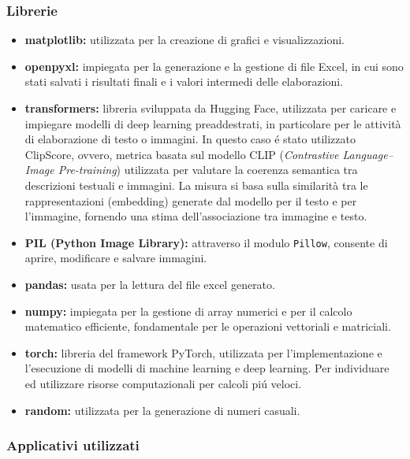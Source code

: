 \documentclass{article}
\begin{document}
\subsubsection{Librerie}
\begin{itemize}
\item \textbf{matplotlib:} utilizzata per la creazione di grafici e visualizzazioni.

\item \textbf{openpyxl:} impiegata per la generazione e la gestione di file Excel, in cui sono stati salvati i risultati finali e i valori intermedi delle elaborazioni.

\item \textbf{transformers:} libreria sviluppata da Hugging Face, utilizzata per caricare e impiegare modelli di deep learning preaddestrati, in particolare per le attività di elaborazione di testo o immagini. In questo caso é stato utilizzato ClipScore, ovvero, metrica basata sul modello CLIP (\emph{Contrastive Language–Image Pre-training}) utilizzata per valutare la coerenza semantica tra descrizioni testuali e immagini. La misura si basa sulla similarità tra le rappresentazioni (embedding) generate dal modello per il testo e per l’immagine, fornendo una stima dell'associazione tra immagine e testo.

\item \textbf{PIL (Python Image Library):} attraverso il modulo \texttt{Pillow}, consente di aprire, modificare e salvare immagini.

\item \textbf{pandas:} usata per la lettura del file excel generato.

\item \textbf{numpy:} impiegata per la gestione di array numerici e per il calcolo matematico efficiente, fondamentale per le operazioni vettoriali e matriciali.

\item \textbf{torch:} libreria del framework PyTorch, utilizzata per l’implementazione e l’esecuzione di modelli di machine learning e deep learning. Per individuare ed utilizzare risorse computazionali per calcoli piú veloci.

\item \textbf{random:} utilizzata per la generazione di numeri casuali.

\end{itemize}

\subsubsection{Applicativi utilizzati}
\end{document}
